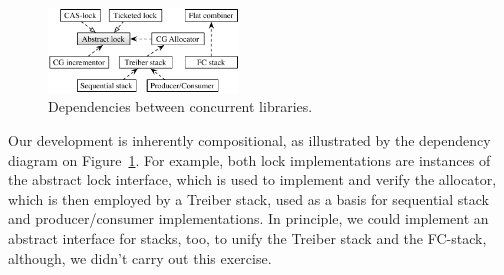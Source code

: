 %
{
\setlength{\belowcaptionskip}{-10pt}  
\begin{figure}[t!]
\centering
\includegraphics[width=0.45\textwidth]{dependencies.pdf}
\vspace{-5pt}       
\caption{Dependencies between concurrent libraries.}
\label{fig:deps}
\end{figure}
}
%
Our development is inherently compositional, as illustrated by the
dependency diagram on Figure~\ref{fig:deps}. For example, both lock
implementations are instances of the abstract lock interface,
%
%
which is used to implement and verify the allocator, which is then
employed by a Treiber stack, used as a basis for sequential stack
and producer/consumer implementations. In principle, we could
implement an abstract interface for stacks, too, to unify the Treiber
stack and the FC-stack, although, we didn't carry out this exercise.


